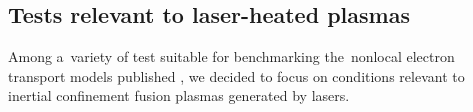 \subsection{Tests relevant to laser-heated plasmas}
\label{sec:SimulationResults}

Among a~variety of test suitable for benchmarking the~nonlocal electron 
transport models published 
\cite{Epperlein_PoFB1991, marocchino2013, Sorbo_2015, 
Sorbo_2016, Sherlock_PoP2017, Brodrick_PoP2017}, we decided to focus on 
conditions relevant to inertial confinement fusion plasmas generated by lasers.

